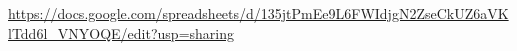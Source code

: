 \label{appendix:berechnungAHP}

\url{https://docs.google.com/spreadsheets/d/135jtPmEe9L6FWIdjgN2ZseCkUZ6aVKlTdd6l_VNYOQE/edit?usp=sharing}